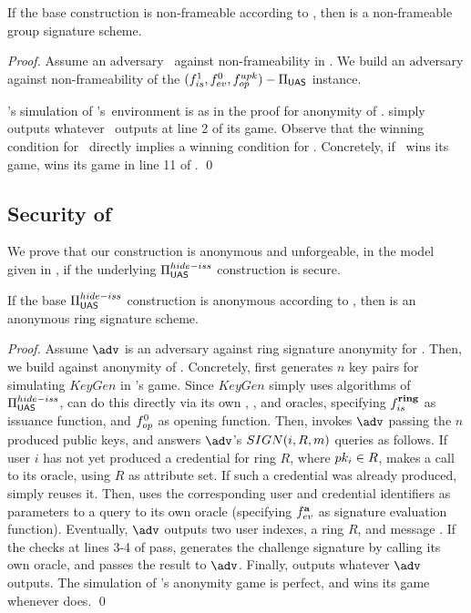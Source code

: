 \begin{theorem}
  If the base \CUASGen construction is non-frameable according to
  , then \CUASGS is a non-frameable group signature
  scheme.
\end{theorem}

\begin{proof}
  Assume an adversary \adv~against non-frameability in \CUASGS. We build an
  adversary \advB against non-frameability of the $(f_{is}^1,f_{ev}^0,
  f_{op}^{upk})-\Pi_{\mathsf{UAS}}$ instance.
  
  \advB's simulation of \adv's~environment is as in the proof for anonymity
  of \CUASGS. \advB simply outputs whatever \adv~outputs at line 2 of its
  game. Observe that the winning condition for \adv~directly implies a winning
  condition for \advB. Concretely, if \adv~wins its game, \advB wins its game
  in line 11 of \ExpNonframe.
  \qed
\end{proof}

\subsection{Security of \CUASRing}

We prove that our \CUASRing construction is anonymous and unforgeable, in the
model given in \cite{bkm06}, if the underlying $\Pi_{\mathsf{UAS}}^{hide-iss}$
construction is secure.

\begin{theorem}
  If the base $\Pi_{\mathsf{UAS}}^{hide-iss}$ construction is anonymous according to
  , then \CUASRing is an anonymous ring signature
  scheme.
\end{theorem}

\begin{proof}
  Assume $\adv$ is an adversary against ring signature anonymity for \CUASRing.
  Then, we build \advB against anonymity of \CUASGen. Concretely, \advB first
  generates $n$ key pairs for \adv simulating $KeyGen$ in \adv's game. Since
  $KeyGen$ simply uses algorithms of $\Pi_{\mathsf{UAS}}^{hide-iss}$, \advB can do this
  directly via its own \HUGEN, \ISET, and \OGEN oracles, specifying
  $f_{is}^{\mathbf{ring}}$ as issuance function, and $f_{op}^0$ as opening function.
  Then, \advB invokes $\adv$ passing the $n$ produced public keys, and
  answers $\adv$'s $SIGN(i,R,m)$ queries as follows. If user $i$ has not yet
  produced a credential for ring $R$, where $pk_i \in R$, \advB makes a call to
  its \OBTAIN oracle, using $R$ as attribute set. If such a credential was already
  produced, \advB simply reuses it. Then, \advB uses the corresponding user and
  credential identifiers as parameters to a query to its own \SIGN oracle
  (specifying $f_{ev}^{\mathbf{a}}$ as signature evaluation function). Eventually,
  $\adv$ outputs two user indexes, a ring $R$, and message \msg. If the checks
  at lines 3-4 of  pass, \advB generates the challenge
  signature by calling its own \CHALb oracle, and passes the result to $\adv$.
  Finally, \advB outputs whatever $\adv$ outputs.
  The simulation of \adv's anonymity game is perfect, and \advB wins its game
  whenever \adv does.
  \qed
\end{proof}

